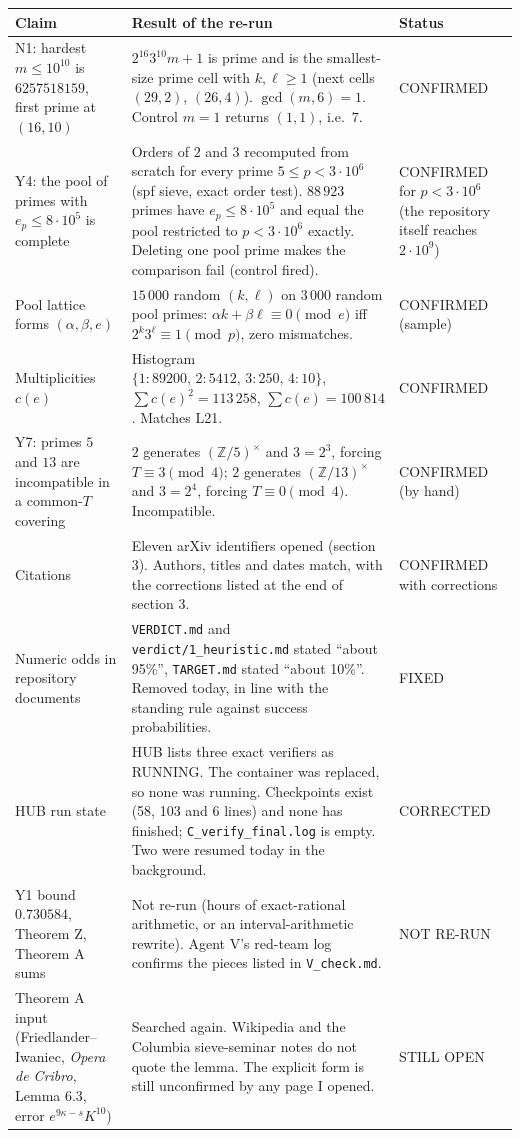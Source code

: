 \documentclass[11pt,a4paper]{article}
\begin{document}
\begin{longtable}{P{4.6cm}P{8.2cm}P{2.3cm}}
\toprule
Claim & Result of the re-run & Status\\\midrule
\endhead
N1: hardest $m\le10^{10}$ is $6257518159$, first prime at $(16,10)$ & $2^{16}3^{10}m+1$ is prime and is the smallest-size prime cell with $k,\ell\ge1$ (next cells $(29,2)$, $(26,4)$). $\gcd(m,6)=1$. Control $m=1$ returns $(1,1)$, i.e.\ $7$. & CONFIRMED\\
Y4: the pool of primes with $e_p\le8\cdot10^5$ is complete & Orders of $2$ and $3$ recomputed from scratch for every prime $5\le p<3\cdot10^6$ (spf sieve, exact order test). $88\,923$ primes have $e_p\le8\cdot10^5$ and equal the pool restricted to $p<3\cdot10^6$ exactly. Deleting one pool prime makes the comparison fail (control fired). & CONFIRMED for $p<3\cdot10^6$ (the repository itself reaches $2\cdot10^9$)\\
Pool lattice forms $(\alpha,\beta,e)$ & $15\,000$ random $(k,\ell)$ on $3\,000$ random pool primes: $\alpha k+\beta\ell\equiv0\pmod e$ iff $2^k3^\ell\equiv1\pmod p$, zero mismatches. & CONFIRMED (sample)\\
Multiplicities $c(e)$ & Histogram $\{1{:}89200,\,2{:}5412,\,3{:}250,\,4{:}10\}$, $\sum c(e)^2=113\,258$, $\sum c(e)=100\,814$. Matches L21. & CONFIRMED\\
Y7: primes $5$ and $13$ are incompatible in a common-$T$ covering & $2$ generates $(\mathbb Z/5)^\times$ and $3=2^3$, forcing $T\equiv3\pmod4$; $2$ generates $(\mathbb Z/13)^\times$ and $3=2^4$, forcing $T\equiv0\pmod4$. Incompatible. & CONFIRMED (by hand)\\
Citations & Eleven arXiv identifiers opened (section 3). Authors, titles and dates match, with the corrections listed at the end of section 3. & CONFIRMED with corrections\\
Numeric odds in repository documents & \texttt{VERDICT.md} and \texttt{verdict/1\_heuristic.md} stated ``about 95\%'', \texttt{TARGET.md} stated ``about 10\%''. Removed today, in line with the standing rule against success probabilities. & FIXED\\
HUB run state & HUB lists three exact verifiers as RUNNING. The container was replaced, so none was running. Checkpoints exist (58, 103 and 6 lines) and none has finished; \texttt{C\_verify\_final.log} is empty. Two were resumed today in the background. & CORRECTED\\
Y1 bound $0.730584$, Theorem Z, Theorem A sums & Not re-run (hours of exact-rational arithmetic, or an interval-arithmetic rewrite). Agent V's red-team log confirms the pieces listed in \texttt{V\_check.md}. & NOT RE-RUN\\
Theorem A input (Friedlander--Iwaniec, \emph{Opera de Cribro}, Lemma 6.3, error $e^{9\kappa-s}K^{10}$) & Searched again. Wikipedia and the Columbia sieve-seminar notes do not quote the lemma. The explicit form is still unconfirmed by any page I opened. & STILL OPEN\\
\bottomrule
\end{longtable}
\end{document}
